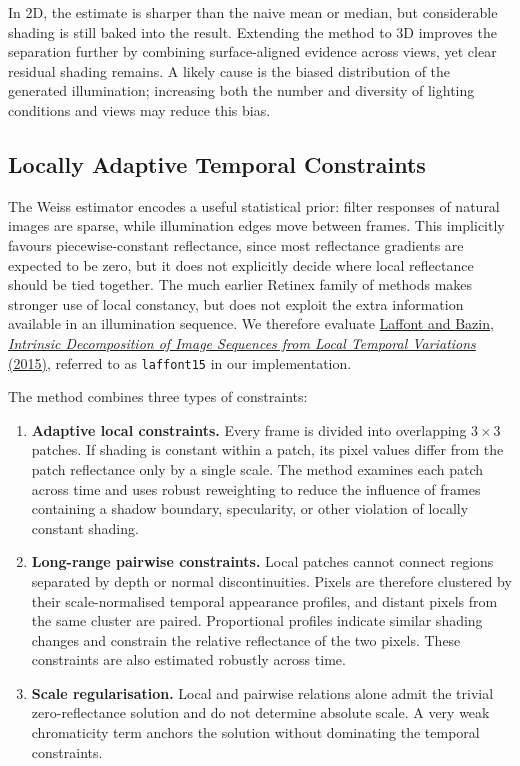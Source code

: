 \documentclass[11pt]{article}
\begin{document}
In 2D, the estimate is sharper than the naive mean or median, but considerable
shading is still baked into the result. Extending the method to 3D improves the
separation further by combining surface-aligned evidence across views, yet
clear residual shading remains. A likely cause is the biased distribution of
the generated illumination; increasing both the number and diversity of
lighting conditions and views may reduce this bias.

\subsection{Locally Adaptive Temporal Constraints}

The Weiss estimator encodes a useful statistical prior: filter responses of
natural images are sparse, while illumination edges move between frames. This
implicitly favours piecewise-constant reflectance, since most reflectance
gradients are expected to be zero, but it does not explicitly decide where
local reflectance should be tied together. The much earlier Retinex family of
methods makes stronger use of local constancy, but does not exploit the extra
information available in an illumination sequence. We therefore evaluate
\href{https://openaccess.thecvf.com/content_cvpr_2015/papers/Laffont_Intrinsic_Decomposition_of_2015_CVPR_paper.pdf}{Laffont and Bazin, \emph{Intrinsic Decomposition of Image Sequences from Local
Temporal Variations} (2015)}, referred to as \texttt{laffont15} in our
implementation.

The method combines three types of constraints:

\begin{enumerate}
  \item \textbf{Adaptive local constraints.} Every frame is divided into
  overlapping $3\times3$ patches. If shading is constant within a patch, its
  pixel values differ from the patch reflectance only by a single scale. The
  method examines each patch across time and uses robust reweighting to reduce
  the influence of frames containing a shadow boundary, specularity, or other
  violation of locally constant shading.

  \item \textbf{Long-range pairwise constraints.} Local patches cannot connect
  regions separated by depth or normal discontinuities. Pixels are therefore
  clustered by their scale-normalised temporal appearance profiles, and
  distant pixels from the same cluster are paired. Proportional profiles
  indicate similar shading changes and constrain the relative reflectance of
  the two pixels. These constraints are also estimated robustly across time.

  \item \textbf{Scale regularisation.} Local and pairwise relations alone admit
  the trivial zero-reflectance solution and do not determine absolute scale. A
  very weak chromaticity term anchors the solution without dominating the
  temporal constraints.
\end{enumerate}
\end{document}
